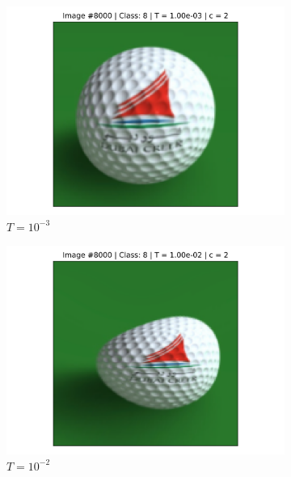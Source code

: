 \begin{figure}[!h]
    \centering
    \begin{subfigure}{0.18\textwidth}
    \includegraphics[width=\textwidth]{ch1-diffy/figures/warping_examples/8000_3_0.png}
    \caption{$T=10^{-3}$}
    \end{subfigure}
    \begin{subfigure}{0.18\textwidth}
    \includegraphics[width=\textwidth]{ch1-diffy/figures/warping_examples/8000_2_0.png}
    \caption{$T=10^{-2}$}
    \end{subfigure}
    \begin{subfigure}{0.18\textwidth}

\end{subfigure}
\end{figure}
